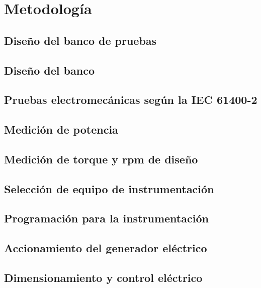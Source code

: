 


\chapter{Metodología}


\section{Diseño del banco de pruebas}
\section{Diseño del banco}
\section{Pruebas electromecánicas según la IEC 61400-2} 
\section{Medición de potencia }
\section{Medición de torque y rpm de diseño }
\section{Selección de equipo de instrumentación} 
\section{Programación para la instrumentación }
\section{Accionamiento del generador eléctrico} 
\section{Dimensionamiento y control eléctrico}
